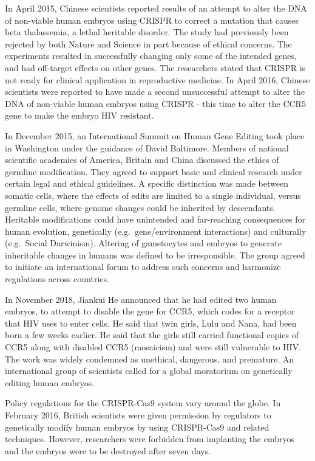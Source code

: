 In April 2015, Chinese scientists reported results of an attempt to alter the DNA of non-viable human embryos using CRISPR to correct a mutation that causes beta thalassemia, a lethal heritable disorder. The study had previously been rejected by both Nature and Science in part because of ethical concerns. The experiments resulted in successfully changing only some of the intended genes, and had off-target effects on other genes. The researchers stated that CRISPR is not ready for clinical application in reproductive medicine. In April 2016, Chinese scientists were reported to have made a second unsuccessful attempt to alter the DNA of non-viable human embryos using CRISPR - this time to alter the CCR5 gene to make the embryo HIV resistant.

In December 2015, an International Summit on Human Gene Editing took place in Washington under the guidance of David Baltimore. Members of national scientific academies of America, Britain and China discussed the ethics of germline modification. They agreed to support basic and clinical research under certain legal and ethical guidelines. A specific distinction was made between somatic cells, where the effects of edits are limited to a single individual, versus germline cells, where genome changes could be inherited by descendants. Heritable modifications could have unintended and far-reaching consequences for human evolution, genetically (e.g.~gene/environment interactions) and culturally (e.g.~Social Darwinism). Altering of gametocytes and embryos to generate inheritable changes in humans was defined to be irresponsible. The group agreed to initiate an international forum to address such concerns and harmonize regulations across countries.

In November 2018, Jiankui He announced that he had edited two human embryos, to attempt to disable the gene for CCR5, which codes for a receptor that HIV uses to enter cells. He said that twin girls, Lulu and Nana, had been born a few weeks earlier. He said that the girls still carried functional copies of CCR5 along with disabled CCR5 (mosaicism) and were still vulnerable to HIV. The work was widely condemned as unethical, dangerous, and premature. An international group of scientists called for a global moratorium on genetically editing human embryos.

Policy regulations for the CRISPR-Cas9 system vary around the globe. In February 2016, British scientists were given permission by regulators to genetically modify human embryos by using CRISPR-Cas9 and related techniques. However, researchers were forbidden from implanting the embryos and the embryos were to be destroyed after seven days.

